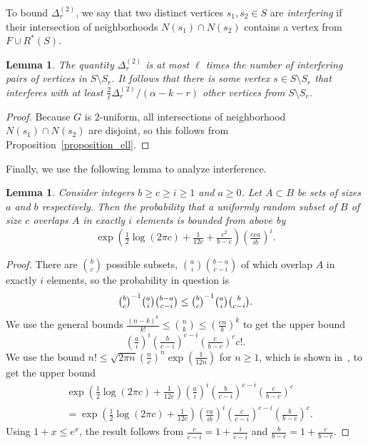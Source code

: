 \documentclass{article}
\theoremstyle{plain}
\theoremstyle{remark}
\theoremstyle{plain}
\newtheorem{lemma}[theorem]{Lemma}
\numberwithin{equation}{section}
\begin{document}
	To bound $\Delta_r^{(2)}$, we say that two distinct vertices $s_1,s_2\in S$ are \emph{interfering} if their intersection of neighborhoods $N(s_1)\cap N(s_2)$ contains a vertex from $F\cup R^*(S)$.
	
	\begin{lemma}\label{lemma_delta2}
		The quantity $\Delta_r^{(2)}$ is at most $\ell$ times the number of interfering pairs of vertices in $S\setminus S_r$. It follows that there is some vertex $s\in S\setminus S_r$ that interferes with at least $\frac{2}{\ell}\Delta_r^{(2)}/(\alpha-k-r)$ other vertices from $S\setminus S_r$.
	\end{lemma}
	
	\begin{proof}
		Because $G$ is $2$-uniform, all intersections of neighborhood $N(s_1)\cap N(s_2)$ are disjoint, so this follows from Proposition~\ref{proposition_ell}.
	\end{proof}
	
	Finally, we use the following lemma to analyze interference.
	
	\begin{lemma}\label{lemma_subset}
		Consider integers $b\geq c\geq i\geq1$ and $a\geq0$. Let $A\subset B$ be sets of sizes $a$ and $b$ respectively. Then the probability that a uniformly random subset of $B$ of size $c$ overlaps $A$ in exactly $i$ elements is bounded from above by $$\exp\left(\tfrac12\log(2\pi c)+\tfrac{1}{12c}+\tfrac{c^2}{b-c}\right)\left(\tfrac{eca}{ib}\right)^i.$$
	\end{lemma}
	
	\begin{proof}
		There are $\binom{b}{c}$ possible subsets, $\binom{a}{i}\binom{b-a}{c-i}$ of which overlap $A$ in exactly $i$ elements, so the probability in question is $$\tbinom{b}{c}^{-1}\tbinom{a}{i}\tbinom{b-a}{c-i}\leq\tbinom{b}{c}^{-1}\tbinom{a}{i}\tbinom{b}{c-i}.$$ We use the general bounds $\frac{(n-k)^k}{k!}\leq\binom{n}{k}\leq(\frac{en}{k})^k$ to get the upper bound $$(\tfrac{a}{i})^i(\tfrac{b}{c-i})^{c-i}(\tfrac{e}{b-c})^cc!.$$ We use the bound $n!\leq\sqrt{2\pi n}(\frac{n}{e})^n\exp(\frac{1}{12n})$ for $n\geq1$, which is shown in~\cite{Stirling}, to get the upper bound
		\begin{align}
			&\exp\left(\tfrac12\log(2\pi c)+\tfrac1{12c}\right)(\tfrac{a}{i})^i(\tfrac{b}{c-i})^{c-i}(\tfrac{c}{b-c})^c
			\\&=\exp\left(\tfrac12\log(2\pi c)+\tfrac1{12c}\right)(\tfrac{ca}{ib})^i(\tfrac{c}{c-i})^{c-i}(\tfrac{b}{b-c})^c.
		\end{align}
		Using $1+x\leq e^x$, the result follows from $\frac{c}{c-i}=1+\frac{i}{c-i}$ and $\frac{b}{b-c}=1+\frac{c}{b-c}$. 
	\end{proof}
	
\end{document}
